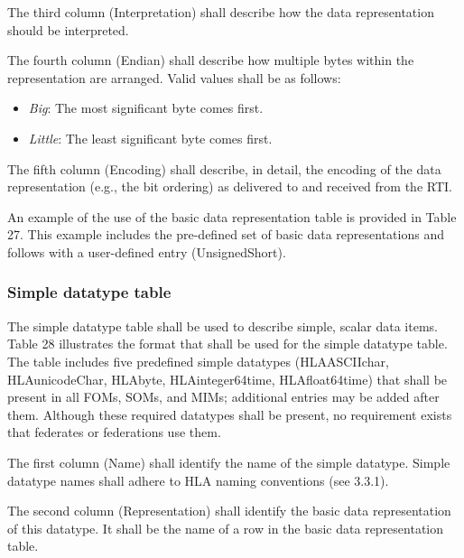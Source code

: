 The third column (Interpretation) shall describe how the data representation should be interpreted.

The fourth column (Endian) shall describe how multiple bytes within the representation are arranged. Valid values shall be as follows:
\begin{itemize}
    \item \textit{Big}: The most significant byte comes first.
    \item \textit{Little}: The least significant byte comes first.
\end{itemize}

The fifth column (Encoding) shall describe, in detail, the encoding of the data representation (e.g., the bit ordering) as delivered to and received from the RTI.

An example of the use of the basic data representation table is provided in Table 27. This example includes the pre-defined set of basic data representations and follows with a user-defined entry (UnsignedShort).

\subsubsection{Simple datatype table}
The simple datatype table shall be used to describe simple, scalar data items. Table 28 illustrates the format that shall be used for the simple datatype table. The table includes five predefined simple datatypes (HLAASCIIchar, HLAunicodeChar, HLAbyte, HLAinteger64time, HLAfloat64time) that shall be present in all FOMs, SOMs, and MIMs; additional entries may be added after them. Although these required datatypes shall be present, no requirement exists that federates or federations use them.

The first column (Name) shall identify the name of the simple datatype. Simple datatype names shall adhere to HLA naming conventions (see 3.3.1).

The second column (Representation) shall identify the basic data representation of this datatype. It shall be the name of a row in the basic data representation table.


